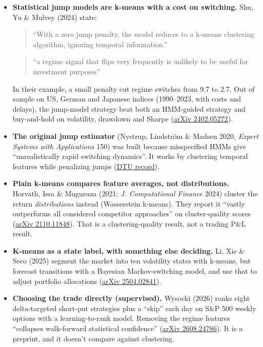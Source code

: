 \documentclass{article}
\begin{document}
\begin{itemize}

\item \textbf{Statistical jump models are k-means with a cost on switching.} Shu, Yu \& Mulvey (2024) state:

\begin{quote}``With a zero jump penalty, the model reduces to a k-means clustering algorithm, ignoring temporal information.''\end{quote}

\begin{quote}``a regime signal that flips very frequently is unlikely to be useful for investment purposes''\end{quote}

In their example, a small penalty cut regime switches from 9.7 to 2.7. Out of sample on US, German and Japanese indices (1990--2023, with costs and delays), the jump-model strategy beat both an HMM-guided strategy and buy-and-hold on volatility, drawdown and Sharpe (\href{https://arxiv.org/abs/2402.05272}{arXiv 2402.05272}).

\item \textbf{The original jump estimator} (Nystrup, Lindström \& Madsen 2020, \emph{Expert Systems with Applications} 150) was built because misspecified HMMs give ``unrealistically rapid switching dynamics''. It works by clustering temporal features while penalizing jumps (\href{https://orbit.dtu.dk/en/publications/learning-hidden-markov-models-with-persistent-states-by-penalizin}{DTU record}).

\item \textbf{Plain k-means compares feature averages, not distributions.} Horvath, Issa \& Muguruza (2021; \emph{J. Computational Finance} 2024) cluster the return \emph{distributions} instead (Wasserstein k-means). They report it ``vastly outperforms all considered competitor approaches'' on cluster-quality scores (\href{https://arxiv.org/abs/2110.11848}{arXiv 2110.11848}). That is a clustering-quality result, not a trading P\&L result.

\item \textbf{K-means as a state label, with something else deciding.} Li, Xie \& Seco (2025) segment the market into ten volatility states with k-means, but forecast transitions with a Bayesian Markov-switching model, and use that to adjust portfolio allocations (\href{https://arxiv.org/abs/2504.02841}{arXiv 2504.02841}).

\item \textbf{Choosing the trade directly (supervised).} Wysocki (2026) ranks eight delta-targeted short-put strategies plus a ``skip'' each day on S\&P 500 weekly options with a learning-to-rank model. Removing the regime features ``collapses walk-forward statistical confidence'' (\href{https://arxiv.org/abs/2608.24786}{arXiv 2608.24786}). It is a preprint, and it doesn't compare against clustering.

\end{itemize}
\end{document}
